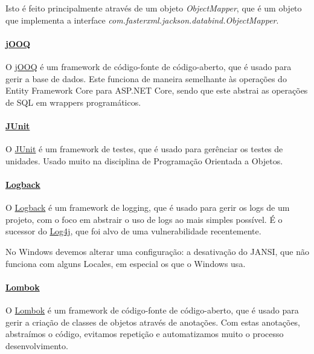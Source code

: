 Isto é feito principalmente através de um objeto \textit{ObjectMapper}, que é um objeto que implementa a interface \textit{com.fasterxml.jackson.databind.ObjectMapper}.

\paragraph{\href{https://jooq.org/}{jOOQ}\\}

O \href{https://jooq.org/}{jOOQ} é um framework de código-fonte de código-aberto, que é usado para gerir a base de dados. Este funciona de maneira semelhante às operações do Entity Framework Core para ASP.NET Core, sendo que este abstrai as operações de SQL em wrappers programáticos.

\paragraph{\href{https://junit.org/junit5/}{JUnit}\\}

O \href{https://junit.org/junit5/}{JUnit} é um framework de testes, que é usado para gerênciar os testes de unidades. Usado muito na disciplina de Programação Orientada a Objetos.

\paragraph{\href{https://logback.qos.ch/}{Logback}\\}

O \href{https://logback.qos.ch/}{Logback} é um framework de logging, que é usado para gerir os logs de um projeto, com o foco em abstrair o uso de logs ao mais simples possível. É o sucessor do \href{https://log4j.org/}{Log4j}, que foi alvo de uma vulnerabilidade recentemente.

No Windows devemos alterar uma configuração: a desativação do JANSI, que não funciona com alguns Locales, em especial os que o Windows usa.

\paragraph{\href{https://projectlombok.org/}{Lombok}\\}

O \href{https://projectlombok.org/}{Lombok} é um framework de código-fonte de código-aberto, que é usado para gerir a criação de classes de objetos através de anotações. Com estas anotações, abstraímos o código, evitamos repetição e automatizamos muito o processo desenvolvimento.

